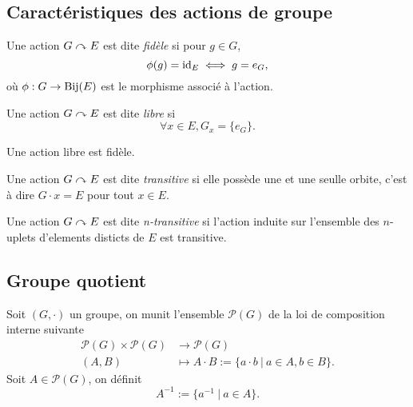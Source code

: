 \subsection{Caractéristiques des actions de groupe}

\begin{defn}
	Une action $G \curvearrowright E$ est dite \emph{fidèle} si pour $g \in G$,
	\begin{equation*}
		\phi(g) = \operatorname{id}_E \iff g = e_G,
	\end{equation*}
	où $\phi : G \to \operatorname{Bij}(E)$ est le morphisme associé à l'action.
\end{defn}

\begin{defn}
	Une action $G \curvearrowright E$ est dite \emph{libre} si
	\begin{equation*}
		\forall x \in E, G_x = \{e_G\}.
	\end{equation*}
\end{defn}

\begin{rmq}
	Une action libre est fidèle.	
\end{rmq}

\begin{defn}
	Une action $G \curvearrowright E$ est dite \emph{transitive} si elle
	possède une et une seulle orbite, c'est à dire $G \cdot x = E$ pour tout $x \in E$.
\end{defn}

\begin{defn}
	Une action $G \curvearrowright E$ est dite \emph{n-transitive} si l'action induite sur
	l'ensemble des $n$-uplets d'elements disticts de $E$ est transitive.
\end{defn}

\subsection{Groupe quotient}

Soit $(G, \cdot)$ un groupe, on munit l'ensemble $\mathcal{P}(G)$
de la loi de composition interne suivante
\begin{align*}
	\mathcal{P}(G) \times \mathcal{P}(G) &\to \mathcal{P}(G)\\
	(A, B) &\mapsto A \cdot B := \{a \cdot b\ |\ a \in A, b \in B\}.
\end{align*}
Soit $A \in \mathcal{P}(G)$, on définit
\begin{equation*}
	A^{-1} := \{a^{-1}\ |\ a \in A\}.
\end{equation*}

